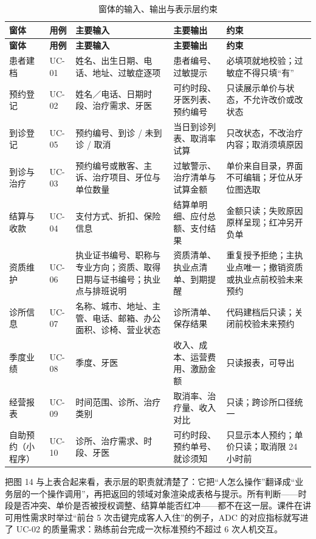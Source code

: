 \documentclass[11pt,a4paper]{ctexart}
\begin{document}
{\small
\begin{longtable}{@{}L{2.35cm}L{1.55cm}L{3.85cm}L{3.45cm}L{2.95cm}@{}}
\caption{窗体的输入、输出与表示层约束}\\
\toprule
\textbf{\textcolor{adcblue!92}{窗体}} & \textbf{\textcolor{adcblue!92}{用例}} & \textbf{\textcolor{adcblue!92}{主要输入}} & \textbf{\textcolor{adcblue!92}{主要输出}} & \textbf{\textcolor{adcblue!92}{约束}} \\
\midrule
\endfirsthead
\toprule
\textbf{\textcolor{adcblue!92}{窗体}} & \textbf{\textcolor{adcblue!92}{用例}} & \textbf{\textcolor{adcblue!92}{主要输入}} & \textbf{\textcolor{adcblue!92}{主要输出}} & \textbf{\textcolor{adcblue!92}{约束}} \\
\midrule
\endhead
\bottomrule
\endfoot
患者建档 & UC-01 & 姓名、出生日期、电话、地址、过敏症逐项 & 患者编号、过敏提示 & 必填项就地校验；过敏症不得只填“有” \\
预约登记 & UC-02 & 姓名／电话、日期时段、治疗需求、牙医 & 可约时段、牙医列表、预约编号 & 只读展示单价与状态，不允许改价或改状态 \\
到诊登记 & UC-05 & 预约编号、到诊 / 未到诊 / 取消 & 当日到诊列表、取消率试算 & 只改状态，不改治疗内容；取消须填原因 \\
到诊与治疗 & UC-03 & 预约编号或散客、主诉、治疗项目、牙位与单位数量 & 过敏警示、治疗清单与试算金额 & 单价来自目录，界面不可编辑；牙位从牙位图选取 \\
结算与收款 & UC-04 & 支付方式、折扣、保险信息 & 结算单明细、应付总额、支付结果 & 金额只读；失败原因原样呈现；红冲另开负单 \\
资质维护 & UC-06 & 执业证书编号、职称与专业方向；资质、取得日期与证书编号；执业点与排班说明 & 资质清单、执业点清单、到期提醒 & 重复授予拒绝；主执业点唯一；撤销资质或执业点前校验未来预约 \\
诊所信息 & UC-07 & 名称、城市、地址、主管、电话、邮箱、办公面积、诊椅、营业状态 & 诊所清单、保存结果 & 代码建档后只读；关闭前校验未来预约 \\
季度业绩 & UC-08 & 季度、牙医 & 收入、成本、运营费用、激励金额 & 只读报表，可导出 \\
经营报表 & UC-09 & 时间范围、诊所、治疗类别 & 取消率、治疗量、收入对比 & 只读；跨诊所口径统一 \\
自助预约（小程序） & UC-10 & 诊所、治疗需求、时段、牙医 & 可约时段、预约单号、就诊须知 & 只显示本人预约；单价只读；取消限 24 小时前 \\
\end{longtable}
}

把图 14 与上表合起来看，表示层的职责就清楚了：它把“人怎么操作”翻译成“业务层的一个操作调用”，再把返回的领域对象渲染成表格与提示。所有判断——时段是否冲突、单价是否被授权调整、结算单能否红冲——都不在这一层。课件在讲可用性需求时举过“前台 5 次击键完成客人入住”的例子，ADC 的对应指标就写进了 UC-02 的质量需求：熟练前台完成一次标准预约不超过 6 次人机交互。
\end{document}
